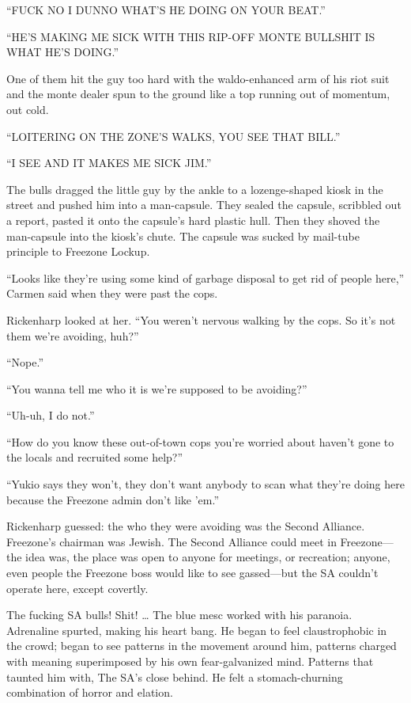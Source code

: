 “FUCK NO I DUNNO WHAT’S HE DOING ON YOUR BEAT.”

“HE’S MAKlNG ME SICK WITH THIS RIP-OFF MONTE BULLSHIT IS WHAT HE’S DOING.”

One of them hit the guy too hard with the waldo-enhanced arm of his riot suit and the monte dealer spun to the ground like a top running out of momentum, out cold.

“LOITERING ON THE ZONE’S WALKS, YOU SEE THAT BILL.”

“I SEE AND IT MAKES ME SICK JIM.”

The bulls dragged the little guy by the ankle to a lozenge-shaped kiosk in the street and pushed him into a man-capsule. They sealed the capsule, scribbled out a report, pasted it onto the capsule’s hard plastic hull. Then they shoved the man-capsule into the kiosk’s chute. The capsule was sucked by mail-tube principle to Freezone Lockup.

“Looks like they’re using some kind of garbage disposal to get rid of people here,” Carmen said when they were past the cops.

Rickenharp looked at her. “You weren’t nervous walking by the cops. So it’s not them we’re avoiding, huh?”

“Nope.”

“You wanna tell me who it is we’re supposed to be avoiding?”

“Uh-uh, I do not.”

“How do you know these out-of-town cops you’re worried about haven’t gone to the locals and recruited some help?”

“Yukio says they won’t, they don’t want anybody to scan what they’re doing here because the Freezone admin don’t like ’em.”

Rickenharp guessed: the who they were avoiding was the Second Alliance. Freezone’s chairman was Jewish. The Second Alliance could meet in Freezone—the idea was, the place was open to anyone for meetings, or recreation; anyone, even people the Freezone boss would like to see gassed—but the SA couldn’t operate here, except covertly.

The fucking SA bulls! Shit! … The blue mesc worked with his paranoia. Adrenaline spurted, making his heart bang. He began to feel claustrophobic in the crowd; began to see patterns in the movement around him, patterns charged with meaning superimposed by his own fear-galvanized mind. Patterns that taunted him with, The SA’s close behind. He felt a stomach-churning combination of horror and elation.

